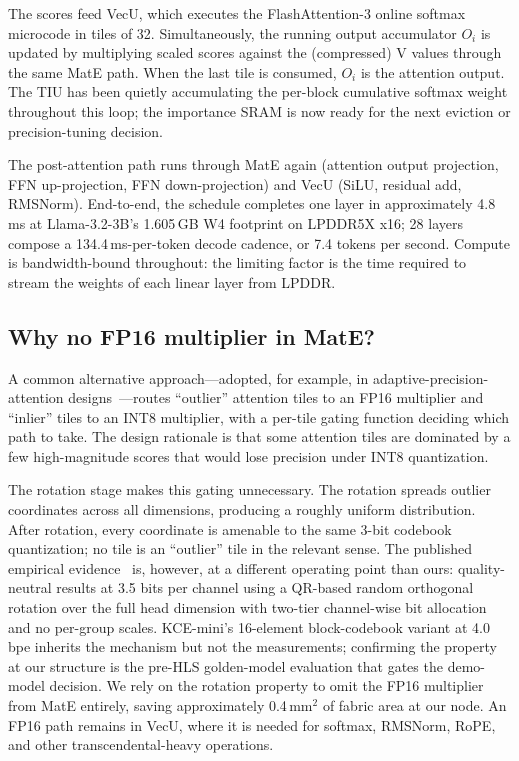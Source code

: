 \documentclass[conference]{IEEEtran}
\begin{document}
The scores feed VecU, which executes the FlashAttention-3 online softmax microcode in tiles of 32. Simultaneously, the running output accumulator $O_i$ is updated by multiplying scaled scores against the (compressed) V values through the same MatE path. When the last tile is consumed, $O_i$ is the attention output. The TIU has been quietly accumulating the per-block cumulative softmax weight throughout this loop; the importance SRAM is now ready for the next eviction or precision-tuning decision.

The post-attention path runs through MatE again (attention output projection, FFN up-projection, FFN down-projection) and VecU (SiLU, residual add, RMSNorm). End-to-end, the schedule completes one layer in approximately 4.8\,ms at Llama-3.2-3B's 1.605\,GB W4 footprint on LPDDR5X x16; 28 layers compose a 134.4\,ms-per-token decode cadence, or 7.4 tokens per second. Compute is bandwidth-bound throughout: the limiting factor is the time required to stream the weights of each linear layer from LPDDR.

\subsection{Why no FP16 multiplier in MatE?}

A common alternative approach---adopted, for example, in adaptive-precision-attention designs~\cite{adaptive_kv,chaithu_acu}---routes ``outlier'' attention tiles to an FP16 multiplier and ``inlier'' tiles to an INT8 multiplier, with a per-tile gating function deciding which path to take. The design rationale is that some attention tiles are dominated by a few high-magnitude scores that would lose precision under INT8 quantization.

The rotation stage makes this gating unnecessary. The rotation spreads outlier coordinates across all dimensions, producing a roughly uniform distribution. After rotation, every coordinate is amenable to the same 3-bit codebook quantization; no tile is an ``outlier'' tile in the relevant sense. The published empirical evidence~\cite{turboquant} is, however, at a different operating point than ours: quality-neutral results at 3.5 bits per channel using a QR-based random orthogonal rotation over the full head dimension with two-tier channel-wise bit allocation and no per-group scales. KCE-mini's 16-element block-codebook variant at 4.0\,bpe inherits the mechanism but not the measurements; confirming the property at our structure is the pre-HLS golden-model evaluation that gates the demo-model decision. We rely on the rotation property to omit the FP16 multiplier from MatE entirely, saving approximately 0.4\,mm$^2$ of fabric area at our node. An FP16 path remains in VecU, where it is needed for softmax, RMSNorm, RoPE, and other transcendental-heavy operations.
\end{document}

